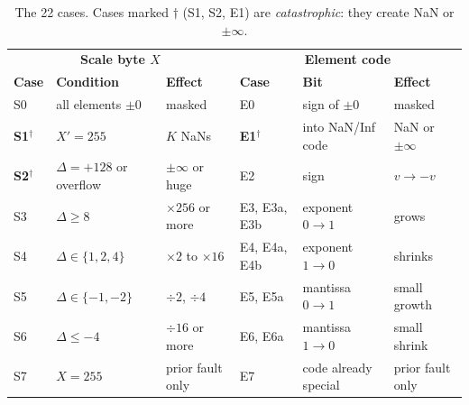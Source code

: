 \documentclass[12pt,a4paper]{article}
\begin{document}
\begin{table}[H]
\centering
\caption{The 22 cases. Cases marked $\dagger$ (S1, S2, E1) are \emph{catastrophic}: they create NaN or $\pm\infty$.}
\label{tab:cases}
\footnotesize
\setlength{\tabcolsep}{4pt}
\begin{tabular}{lll@{\hspace{1.2em}}lll}
\toprule
\multicolumn{3}{c}{\textbf{Scale byte $X$}} & \multicolumn{3}{c}{\textbf{Element code}} \\
\textbf{Case} & \textbf{Condition} & \textbf{Effect} & \textbf{Case} & \textbf{Bit} & \textbf{Effect} \\
\midrule
S0 & all elements $\pm0$ & masked & E0 & sign of $\pm0$ & masked \\
\textbf{S1}$^\dagger$ & $X'=255$ & $K$ NaNs & \textbf{E1}$^\dagger$ & into NaN/Inf code & NaN or $\pm\infty$ \\
\textbf{S2}$^\dagger$ & $\Delta=+128$ or overflow & $\pm\infty$ or huge & E2 & sign & $v\to-v$ \\
S3 & $\Delta\ge8$ & $\times256$ or more & E3, E3a, E3b & exponent $0\to1$ & grows \\
S4 & $\Delta\in\{1,2,4\}$ & $\times2$ to $\times16$ & E4, E4a, E4b & exponent $1\to0$ & shrinks \\
S5 & $\Delta\in\{-1,-2\}$ & $\div2$, $\div4$ & E5, E5a & mantissa $0\to1$ & small growth \\
S6 & $\Delta\le-4$ & $\div16$ or more & E6, E6a & mantissa $1\to0$ & small shrink \\
S7 & $X=255$ & prior fault only & E7 & code already special & prior fault only \\
\bottomrule
\end{tabular}
\end{table}
\end{document}
